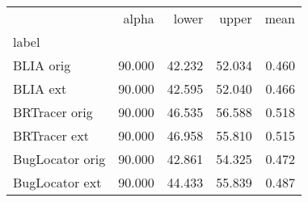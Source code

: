 \begin{tabular}{lrrrr}
\toprule
{} &  alpha &  lower &  upper &  mean \\
label           &        &        &        &       \\
\midrule
BLIA orig       & 90.000 & 42.232 & 52.034 & 0.460 \\
BLIA ext        & 90.000 & 42.595 & 52.040 & 0.466 \\
BRTracer orig   & 90.000 & 46.535 & 56.588 & 0.518 \\
BRTracer ext    & 90.000 & 46.958 & 55.810 & 0.515 \\
BugLocator orig & 90.000 & 42.861 & 54.325 & 0.472 \\
BugLocator ext  & 90.000 & 44.433 & 55.839 & 0.487 \\
\bottomrule
\end{tabular}
